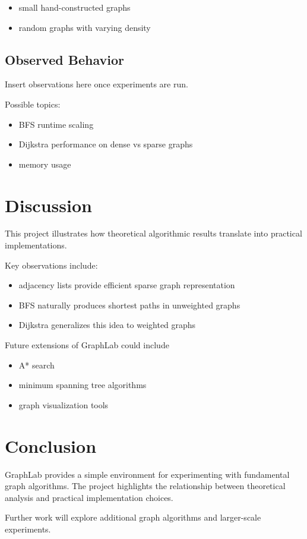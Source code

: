 \documentclass[11pt]{article}
\begin{document}
\begin{itemize}
\item small hand-constructed graphs
\item random graphs with varying density
\end{itemize}

\subsection{Observed Behavior}

Insert observations here once experiments are run.

Possible topics:

\begin{itemize}
\item BFS runtime scaling
\item Dijkstra performance on dense vs sparse graphs
\item memory usage
\end{itemize}

\section{Discussion}

This project illustrates how theoretical algorithmic results translate into
practical implementations.

Key observations include:

\begin{itemize}
\item adjacency lists provide efficient sparse graph representation
\item BFS naturally produces shortest paths in unweighted graphs
\item Dijkstra generalizes this idea to weighted graphs
\end{itemize}

Future extensions of GraphLab could include

\begin{itemize}
\item A* search
\item minimum spanning tree algorithms
\item graph visualization tools
\end{itemize}

\section{Conclusion}

GraphLab provides a simple environment for experimenting with fundamental graph
algorithms. The project highlights the relationship between theoretical
analysis and practical implementation choices.

Further work will explore additional graph algorithms and larger-scale
experiments.

\end{document}
